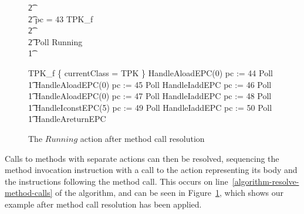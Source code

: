 \begin{figure}[t]
\begin{circus}
    \t2 {} \cdots {} \\
    \t2 {} \circelse pc = 43 \circthen TPK\_f \\
    \t2 {} \cdots {} \\
    \t2 \circfi \circseq Poll \circseq Running \\
    \t1 \circfi
  \end{circus}
  \begin{circus}
    TPK\_f \circdef \{ currentClass = TPK \} \circseq HandleAloadEPC(0) \circseq pc := 44 \circseq Poll \circseq \\
    \t1 HandleAloadEPC(0) \circseq pc := 45 \circseq Poll \circseq HandleIaddEPC \circseq pc := 46 \circseq Poll \circseq \\
    \t1 HandleAloadEPC(0) \circseq pc := 47 \circseq Poll \circseq HandleIaddEPC \circseq pc := 48 \circseq Poll \circseq \\
    \t1 HandleIconstEPC(5) \circseq pc := 49 \circseq Poll \circseq HandleIaddEPC \circseq pc := 50 \circseq Poll \circseq \\
    \t1 HandleAreturnEPC
  \end{circus}
  \caption{The $Running$ action after method call resolution}
  \label{method-call-resolution-example-figure}
\end{figure}

Calls to methods with separate actions can then be resolved,
sequencing the method invocation instruction with a call to the
\Circus{} action representing its body and the instructions following
the method call. 
This occurs on line~\ref{algorithm-resolve-method-calls} of the
algorithm, and can be seen in
Figure~\ref{method-call-resolution-example-figure}, which shows our
example after method call resolution has been applied.


